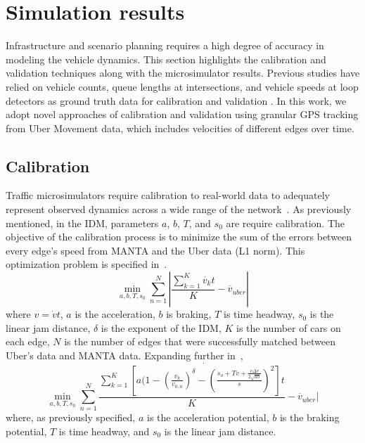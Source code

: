 \documentclass[final]{IEEEtran}
\begin{document}
\section{Simulation results}

Infrastructure and scenario planning requires a high degree of accuracy in modeling the vehicle dynamics. This section highlights the calibration and validation techniques along with the microsimulator results. Previous studies have relied on vehicle counts, queue lengths at intersections, and vehicle speeds at loop detectors as ground truth data for calibration and validation \cite{technicalactivitiesdivisionDynamicTrafficAssignment2011}. In this work, we adopt novel approaches of calibration and validation using granular GPS tracking from Uber Movement data, which includes velocities of different edges over time.

\subsection{Calibration}
Traffic microsimulators require calibration to real-world data to adequately represent observed dynamics across a wide range of the network~\cite{barceloDynamicNetworkSimulation2005}. As previously mentioned, in the IDM, parameters $a$, $b$, $T$, and $s_0$ are require calibration. The objective of the calibration process is to minimize the sum of the errors between every edge's speed from MANTA and the Uber data (L1 norm). This optimization problem is specified in~.
\begin{equation}
    \min_{a,b,T,s_0}{\sum_{n=1}^N}{|\frac{\sum_{k=1}^K{\dot{v_k}t}}{K} - \overline{v}{_{uber}}|}
    \label{eq:calibration}
\end{equation}
where $v = \dot{v}t$, $a$ is the acceleration, $b$ is braking, $T$ is time headway, $s_0$ is the linear jam distance, $\delta$ is the exponent of the IDM, $K$ is the number of cars on each edge, $N$ is the number of edges that were successfully matched between Uber's data and MANTA data. Expanding further in~,
\begin{equation}
    \min_{a,b,T,s_0}{\sum_{n=1}^N}{\frac{\sum_{k=1}^K{\dot{[a(1 - (\frac{v_k}{v_{0,n}})^\delta - (\frac{s_o + Tv + \frac{v\Delta v}{2\sqrt{ab}}}{s})^2]}t}}{K} - \overline{v}{_{uber}}|}
    \label{eq:calibration_full}
\end{equation}
where, as previously specified, $a$ is the acceleration potential, $b$ is the braking potential, $T$ is time headway, and $s_0$ is the linear jam distance.
\end{document}
